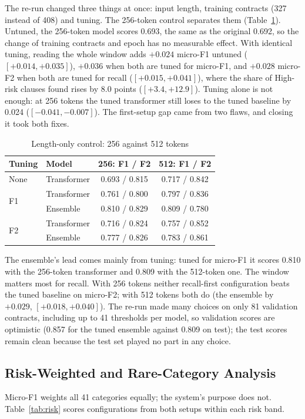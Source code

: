 \documentclass[journal]{IEEEtran}
\begin{document}
The re-run changed three things at once: input length, training contracts (327 instead of 408) and
tuning. The 256-token control separates them (Table~\ref{tab:v2ctrl}). Untuned, the 256-token model
scores 0.693, the same as the original 0.692, so the change of training contracts and epoch has no
measurable effect. With identical tuning, reading the whole window adds $+0.024$ micro-F1 untuned
($[+0.014,+0.035]$), $+0.036$ when both are tuned for micro-F1, and $+0.028$ micro-F2 when both are
tuned for recall ($[+0.015,+0.041]$), where the share of High-risk clauses found rises by 8.0 points
($[+3.4,+12.9]$). Tuning alone is not enough: at 256 tokens the tuned transformer still loses to the
tuned baseline by 0.024 ($[-0.041,-0.007]$). The first-setup gap came from two flaws, and closing
it took both fixes.

\begin{table}[!t]
\caption{Length-only control: 256 against 512 tokens}
\label{tab:v2ctrl}
\centering
\small
\setlength{\tabcolsep}{3pt}
\begin{tabular}{llcc}
\toprule
\textbf{Tuning} & \textbf{Model} & \textbf{256: F1 / F2} & \textbf{512: F1 / F2}\\
\midrule
None & Transformer & 0.693 / 0.815 & 0.717 / 0.842\\
\midrule
\multirow{2}{*}{F1} & Transformer & 0.761 / 0.800 & 0.797 / 0.836\\
 & Ensemble & 0.810 / 0.829 & 0.809 / 0.780\\
\midrule
\multirow{2}{*}{F2} & Transformer & 0.716 / 0.824 & 0.757 / 0.852\\
 & Ensemble & 0.777 / 0.826 & 0.783 / 0.861\\
\bottomrule
\end{tabular}
\end{table}

The ensemble's lead comes mainly from tuning: tuned for micro-F1 it scores 0.810 with the 256-token
transformer and 0.809 with the 512-token one. The window matters most for recall. With 256 tokens
neither recall-first configuration beats the tuned baseline on micro-F2; with 512 tokens both do
(the ensemble by $+0.029$, $[+0.018,+0.040]$). The re-run made many choices on only 81 validation
contracts, including up to 41 thresholds per model, so validation scores are optimistic (0.857 for
the tuned ensemble against 0.809 on test); the test scores remain clean because the test set played
no part in any choice.

\subsection{Risk-Weighted and Rare-Category Analysis}
\label{sec:risk}
Micro-F1 weights all 41 categories equally; the system's purpose does not.
Table~\ref{tab:risk} scores configurations from both setups within each risk band.
\end{document}
